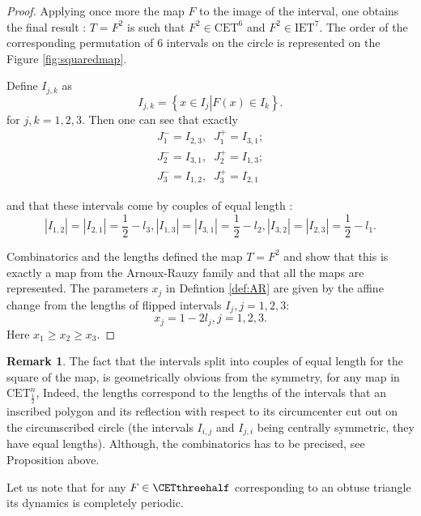 \documentclass[12pt]{article}
\theoremstyle{definition}
\newtheorem*{remark}{Remark}
\begin{document}
\begin{proof}
Applying once more the map $F$ to the image of the interval, one obtains the final result : $T=F^2$ is such that $F^2 \in \mathrm{CET}^6$ and $F^2 \in \mathrm{IET}^7$. The order of the corresponding permutation of $6$ intervals on the circle is represented on the Figure \ref{fig:squaredmap}.

Define $I_{j,k}$ as 
\begin{equation}\label{eq:symbolicdefinitiontwosteps}
I_{j,k}=\left\{
x \in I_j \left| \right. F(x) \in I_k
\right\}.
\end{equation}
for $j,k=1,2,3$. Then one can see that exactly 
\begin{align*}
J_1^{-}=I_{2,3}, \;\; J_1^{+}=I_{3,1};\\
J_2^{-}=I_{3,1},  \; \; J_2^{+}=I_{1,3};\\
J_3^{-}=I_{1,2}, \;\;  J_3^{+}=I_{2,1}
\end{align*}

and that these intervals come by couples of equal length : 
$$|I_{1,2}|=|I_{2,1}|=\frac{1}{2}-l_3, |I_{1,3}|=|I_{3,1}|=\frac{1}{2}-l_2, |I_{3,2}|=|I_{2,3}|=\frac{1}{2}-l_1.$$

Combinatorics and the lengths defined the map $T=F^2$ and show that this is exactly a map from the Arnoux-Rauzy family and that all the maps are represented. The parameters $x_j$ in Defintion \ref{def:AR} are given by the affine change from the lengths of flipped intervals $I_j, j=1,2,3$: 
\begin{equation}\label{eq:relation_x_and_l}
x_j=1-2l_j, j=1,2,3.
\end{equation}
Here $x_1 \geq x_2 \geq x_3$.
\end{proof}

\begin{remark}
The fact that the intervals split into couples of equal length for the square of the map, is geometrically obvious from the symmetry, for any map in $\mathrm{CET}^n_{\frac{1}{2}}$, Indeed, the lengths  correspond to the lengths of the intervals that an inscribed polygon and its reflection with respect to its circumcenter cut out on the circumscribed circle (the intervals $I_{i,j}$ and $I_{j,i}$ being centrally symmetric, they have equal lengths). Although, the combinatorics has to be precised, see Proposition above.
\end{remark}

Let us note that for any $F \in \CETthreehalf$ corresponding to an obtuse triangle its dynamics is completely periodic.
\end{document}

